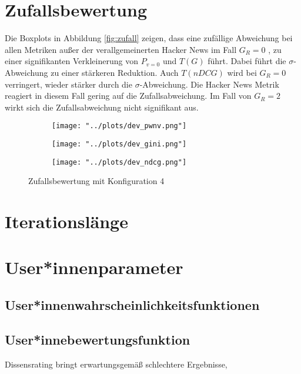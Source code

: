 \section{Zufallsbewertung}


Die Boxplots in Abbildung \ref{fig:zufall} zeigen, dass eine zufällige Abweichung bei allen Metriken außer der verallgemeinerten Hacker News im Fall $G_R = 0$ , zu einer signifikanten Verkleinerung von $P_{v=0}$ und $T(G)$ führt. Dabei führt die $\sigma$-Abweichung zu einer stärkeren Reduktion. Auch $T(nDCG)$ wird bei $G_R = 0$ verringert, wieder stärker durch die $\sigma$-Abweichung. Die Hacker News Metrik reagiert in diesem Fall gering auf die Zufallsabweichung. Im Fall von $G_R = 2$ wirkt sich die Zufallsabweichung nicht signifikant aus.

\begin{figure}[!h]
	\label{fig:zufall}	
	\begin{subfigure}{0.5\textwidth}
		\texttt{[image: "../plots/dev\_pwnv.png"]}
	\end{subfigure}
	\begin{subfigure}{0.5\textwidth}
		\texttt{[image: "../plots/dev\_gini.png"]}
	\end{subfigure}
	\begin{subfigure}{0.5\textwidth}
		\texttt{[image: "../plots/dev\_ndcg.png"]}
	\end{subfigure}
	\caption{Zufallsbewertung mit Konfiguration 4}
\end{figure}


\section{Iterationslänge}

\section{User*innenparameter}

\subsection{User*innenwahrscheinlichkeitsfunktionen}

\subsection{User*innebewertungsfunktion}


Dissensrating bringt erwartungsgemäß schlechtere Ergebnisse, 


